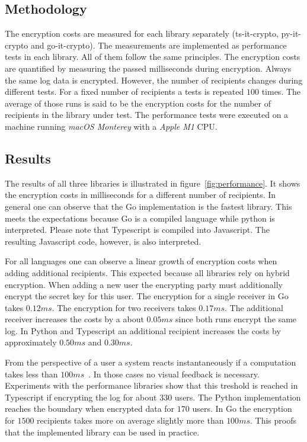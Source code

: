 \documentclass[../main.tex]{subfiles}
\begin{document}
\subsection{Methodology}
The encryption costs are measured for each library separately (ts-it-crypto, py-it-crypto and go-it-crypto).
The measurements are implemented as performance tests in each library.
All of them follow the same principles.
The encryption costs are quantified by measuring the passed milliseconds during encryption.
Always the same log data is encrypted.
However, the number of recipients changes during different tests.
For a fixed number of recipients a tests is repeated $100$ times.
The average of those runs is said to be the encryption costs for the number of recipients in the library under test.
The performance tests were executed on a machine running \emph{macOS Monterey} with a \emph{Apple M1} CPU.

\subsection{Results}
The results of all three libraries is illustrated in figure~\ref{fig:performance}.
It shows the encryption costs in milliseconds for a different number of recipients.
In general one can observe that the Go implementation is the fastest library.
This meets the expectations because Go is a compiled language while python is interpreted.
Please note that Typescript is compiled into Javascript.
The resulting Javascript code, however, is also interpreted.

For all languages one can observe a linear growth of encryption costs when adding additional recipients.
This expected because all libraries rely on hybrid encryption.
When adding a new user the encrypting party must additionally encrypt the secret key for this user.
The encryption for a single receiver in Go takes $0.12ms$.
The encryption for two receivers takes $0.17ms$.
The additional receiver increases the costs by a about $0.05ms$ since both runs encrypt the same log.
In Python and Typescript an additional recipient increases the costs by approximately $0.50ms$ and $0.30ms$.

From the perspective of a user a system reacts instantaneously if a computation takes less than $100ms$~\cite{Nielson1993}.
In those cases no visual feedback is necessary.
Experiments with the performance libraries show that this treshold is reached in Typescript if encrypting the log for about $330$ users.
The Python implementation reaches the boundary when encrypted data for $170$ users.
In Go the encryption for $1500$ recipients takes more on average slightly more than $100ms$.
This proofs that the implemented library can be used in practice.
\end{document}
